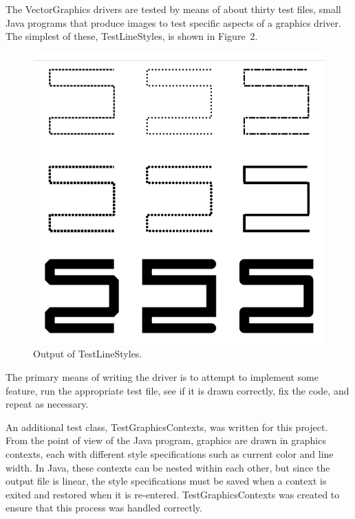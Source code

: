 \documentclass[11pt]{report}
\begin{document}
The VectorGraphics drivers are tested by means of about thirty test files, small Java programs that produce images to test specific aspects of a graphics driver. The simplest of these, TestLineStyles, is shown in Figure~2. \begin{figure}[tb] \hspace{1.5in} \includegraphics[scale=0.4]{TestLineStyles} \caption{Output of TestLineStyles.} \end{figure}  The primary means of writing the driver is to attempt to implement some feature, run the appropriate test file, see if it is drawn correctly, fix the code, and repeat as necessary.

An additional test class, TestGraphicsContexts, was written for this project. From the point of view of the Java program, graphics are drawn in graphics contexts, each with different style specifications such as current color and line width. In Java, these contexts can be nested within each other, but since the output file is linear, the style specifications must be saved when a context is exited and restored when it is re-entered. TestGraphicsContexts was created to ensure that this process was handled correctly.
\end{document}
